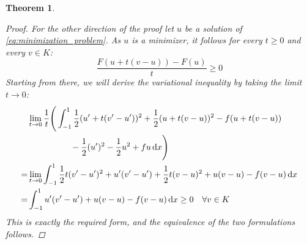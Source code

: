 \documentclass[headsepline,footsepline,footinclude=false,oneside,fontsize=11pt,paper=a4,listof=totoc,bibliography=totoc]{scrbook} %
\newtheorem{theorem}{Theorem}
\begin{document}
\begin{theorem}
\begin{proof}
	For the other direction of the proof let $u$ be a solution of \eqref{eq:minimization_problem}. As $u$ is a minimizer, it follows for every $t \geq 0$ and every $v \in K$:
	\begin{equation*}
	\frac{F(u+t(v-u)) - F(u)}{t} \geq 0
	\end{equation*}
	Starting from there, we will derive the variational inequality by taking the limit $t\rightarrow 0$:
	\begingroup
	\allowdisplaybreaks
	\begin{align*}
	&\lim\limits_{t \rightarrow 0} \frac{1}{t} \Bigg( 
	\int_{-1}^{1} \frac{1}{2} (u'+t(v'-u'))^2 + \frac{1}{2} (u+t(v-u))^2 - f(u+t(v-u))\\
	 &\phantom{\lim\limits_{t \rightarrow 0} \frac{1}{t} \Bigg( 
		\int_{-1}^{1}} -\frac{1}{2}(u')^2  - \frac{1}{2}u^2 + fu \dif x \Bigg) \\
	= &\lim\limits_{t \rightarrow 0} \int_{-1}^1 \frac{1}{2} t(v'-u')^2 + u'(v'-u') + \frac{1}{2}t(v-u)^2 + u(v-u) -f(v-u) \dif x \\
	= & 	\int_{-1}^1 u'(v'-u') + u(v-u) - f(v-u) \dif x \geq 0 \quad \forall v \in K
	\end{align*}
	\endgroup
	This is exactly the required form, and the equivalence of the two formulations follows.
	\end{proof}
\end{theorem}
\end{document}
